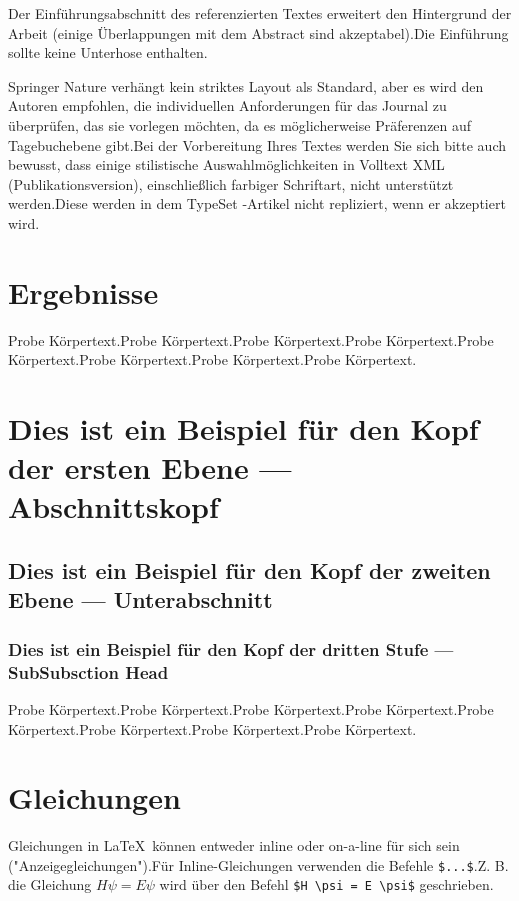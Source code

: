 \documentclass[pdflatex,sn-mathphys-num]{sn-jnl}%
\theoremstyle{thmstyleone}%
\theoremstyle{thmstyletwo}%
\theoremstyle{thmstylethree}%
\begin{document}
Der Einführungsabschnitt des referenzierten Textes \cite{bib1} erweitert den Hintergrund der Arbeit (einige Überlappungen mit dem Abstract sind akzeptabel).Die Einführung sollte keine Unterhose enthalten.

Springer Nature verhängt kein striktes Layout als Standard, aber es wird den Autoren empfohlen, die individuellen Anforderungen für das Journal zu überprüfen, das sie vorlegen möchten, da es möglicherweise Präferenzen auf Tagebuchebene gibt.Bei der Vorbereitung Ihres Textes werden Sie sich bitte auch bewusst, dass einige stilistische Auswahlmöglichkeiten in Volltext XML (Publikationsversion), einschließlich farbiger Schriftart, nicht unterstützt werden.Diese werden in dem TypeSet -Artikel nicht repliziert, wenn er akzeptiert wird.

\section{Ergebnisse} \label{sec2}

Probe Körpertext.Probe Körpertext.Probe Körpertext.Probe Körpertext.Probe Körpertext.Probe Körpertext.Probe Körpertext.Probe Körpertext.

\section{Dies ist ein Beispiel für den Kopf der ersten Ebene --- Abschnittskopf} \label{sec3}

\subsection{Dies ist ein Beispiel für den Kopf der zweiten Ebene --- Unterabschnitt} \label{subsec2}

\subsubsection{Dies ist ein Beispiel für den Kopf der dritten Stufe --- SubSubsction Head} \label{subsubsec2}

Probe Körpertext.Probe Körpertext.Probe Körpertext.Probe Körpertext.Probe Körpertext.Probe Körpertext.Probe Körpertext.Probe Körpertext.

\section{Gleichungen} \label{sec4}

Gleichungen in \LaTeX \ können entweder inline oder on-a-line für sich sein ("Anzeigegleichungen").Für
Inline-Gleichungen verwenden die Befehle \verb+$...$+.Z. B. die Gleichung
$H\psi = E \psi$ wird über den Befehl \verb+$H \psi = E \psi$+ geschrieben.
\end{document}
